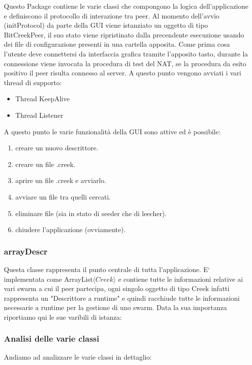 Questo Package contiene le varie classi che compongono la logica dell'applicazione e definiscono il protocollo di interazione tra peer.
Al momento dell'avvio (initProtocol) da parte della GUI viene istanziato un oggetto di tipo BitCreekPeer, il suo stato viene ripristinato dalla precendente esecuzione usando dei file di configurazione presenti in una cartella apposita. Come prima cosa l'utente deve connettersi da interfaccia grafica tramite l'apposito tasto, durante la connessione viene invocata la procedura di test del NAT, se la procedura da esito positivo il peer risulta connesso al server. 
A questo punto vengono avviati i vari thread di supporto:
\begin{itemize}
\item Thread KeepAlive
\item Thread Listener
\end{itemize}

A questo punto le varie funzionalit\`a della GUI sono attive ed \`e possibile:
\begin{enumerate}
\item creare un nuovo descrittore.
\item creare un file .creek.
\item aprire un file .creek e avviarlo.
\item avviare un file tra quelli cercati.
\item eliminare file (sia in stato di seeder che di leecher).
\item chiudere l'applicazione (ovviamente).
\end{enumerate}


\subsubsection{arrayDescr}
Questa classe rappresenta il punto centrale di tutta l'applicazione.
E` implementata come ArrayList$\langle Creek \rangle$ e contiene tutte le informazioni relative ai vari swarm a cui il peer partecipa, ogni singolo oggetto di tipo Creek infatti rappresenta un "Descrittore a runtime" e quindi racchiude tutte le informazioni necessarie a runtime per la gestione di uno swarm. Data la sua importanza riportiamo qui le sue varibili di istanza:



\subsubsection{Analisi delle varie classi}
Andiamo ad analizzare le varie classi in dettaglio:

